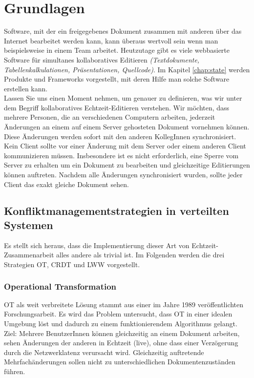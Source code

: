 \chapter{\label{chap:grundlagen}Grundlagen}
Software, mit der ein freigegebenes Dokument zusammen mit anderen über das Internet bearbeitet werden kann, kann überaus wertvoll sein wenn man beispielsweise in einem Team arbeitet. Heutzutage gibt es viele webbasierte Software für simultanes kollaboratives Editieren \textit{(Textdokumente, Tabellenkalkulationen, Präsentationen, Quellcode)}. Im Kapitel \ref{chap:state} werden Produkte und Frameworks vorgestellt, mit deren Hilfe man solche Software erstellen kann.\\
Lassen Sie uns einen Moment nehmen, um genauer zu definieren, was wir unter dem Begriff kollaboratives Echtzeit-Editieren verstehen.
Wir möchten, dass mehrere Personen, die an verschiedenen Computern arbeiten, jederzeit Änderungen an einem auf einem Server gehosteten Dokument vornehmen können. Diese Änderungen werden sofort mit den anderen KollegInnen synchronisiert. Kein Client sollte vor einer Änderung mit dem Server oder einem anderen Client kommunizieren müssen. Insbesondere ist es nicht erforderlich, eine Sperre vom Server zu erhalten um ein Dokument zu bearbeiten und gleichzeitige Editierungen können auftreten. Nachdem alle Änderungen synchronisiert wurden, sollte jeder Client das exakt gleiche Dokument sehen.
%
%
\section{Konfliktmanagementstrategien in verteilten Systemen}
Es stellt sich heraus, dass die Implementierung dieser Art von Echtzeit-Zusammenarbeit alles andere als trivial ist.
Im Folgenden werden die drei Strategien \gls{OT}, \gls{CRDT} und \gls{LWW} vorgestellt.
%
%
\subsection{Operational Transformation}
\gls{OT} als weit verbreitete Lösung stammt aus einer im Jahre 1989 veröffentlichten Forschungsarbeit\cite{ot_paper}.
Es wird das Problem untersucht, dass \gls{OT} in einer idealen Umgebung löst und dadurch zu einem funktionierendem Algorithmus gelangt.\\
Ziel: Mehrere BenutzerInnen können gleichzeitig an einem Dokument arbeiten, sehen Änderungen der anderen in Echtzeit (live), ohne dass einer Verzögerung durch die Netzwerklatenz verursacht wird. Gleichzeitig auftretende Mehrfachänderungen sollen nicht zu unterschiedlichen Dokumentenzuständen führen.

